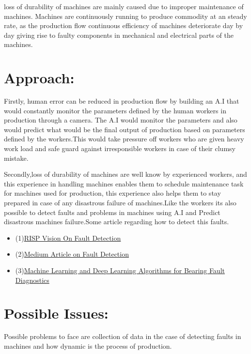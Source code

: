 \documentclass{article}
\begin{document}
\begin{normalsize}
      loss of durability of machines are mainly caused due to improper maintenance of machines. Machines are continuously running to produce commodity at an steady rate, as the production flow continuous efficiency of machines deteriorate day by day giving rise to faulty components in mechanical and electrical parts of the machines.
      
       \section{Approach:}
        
      Firstly, human error can be reduced in production flow by building an A.I that would constantly monitor the parameters defined by the human workers in production through a camera. The A.I would monitor the parameters and also would predict what would be the final output of production based on parameters defined by the workers.This would take pressure off workers who are given heavy work load and safe guard against irresponsible workers in case of their clumsy mistake. 
      
      Secondly,loss of durability of machines are well know by experienced workers, and this experience in handling machines enables them to schedule maintenance task for machines used for production, this experience also helps them to stay prepared in case of any disastrous failure of machines.Like the workers its also possible to detect faults and problems in machines using A.I and Predict disastrous machines failure.Some article regarding how to detect this faults.
       
        \begin{itemize}
         
\item(1)\href{https://www.rsipvision.com/machine-fault-detection-and-classification/}{RISP Vision On Fault Detection} 
\item(2)\href{https://medium.com/bigdatarepublic/machine-learning-for-predictive-maintenance-where-to-start-5f3b7586acfb}{Medium Article on Fault Detection} 
\item(3)\href{https://arxiv.org/pdf/1901.08247.pdf}{Machine Learning and Deep Learning
Algorithms for Bearing Fault Diagnostics}

        \end{itemize}
        
      
        
    	\section{Possible Issues:}
        Possible problems to face are collection of data in the case of detecting faults in machines and how dynamic is the process of production.

\end{normalsize}
\end{document}
